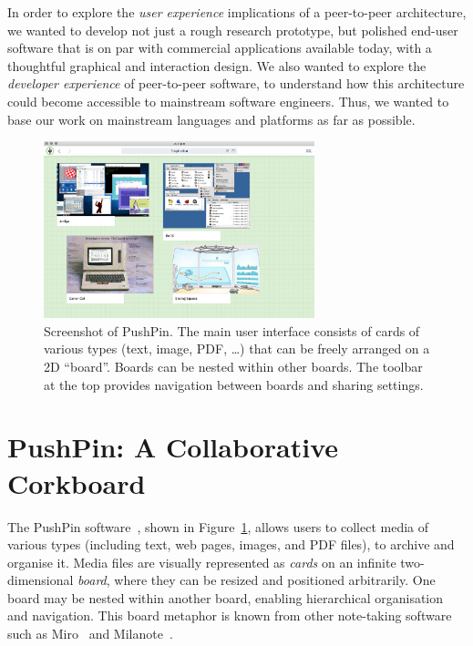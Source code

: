 \documentclass[sigplan,10pt]{acmart}
\begin{document}
In order to explore the \emph{user experience} implications of a peer-to-peer architecture, we wanted to develop not just a rough research prototype, but polished end-user software that is on par with commercial applications available today, with a thoughtful graphical and interaction design.
We also wanted to explore the \emph{developer experience} of peer-to-peer software, to understand how this architecture could become accessible to mainstream software engineers.
Thus, we wanted to base our work on mainstream languages and platforms as far as possible.

\begin{figure}
    \centering
    \includegraphics[width=0.7\textwidth]{pushpin.jpg}
    \caption{Screenshot of PushPin. The main user interface consists of cards of various types (text, image, PDF, \dots) that can be freely arranged on a 2D ``board''. Boards can be nested within other boards. The toolbar at the top provides navigation between boards and sharing settings.}
    \label{fig:pushpin}
\end{figure}

\section{PushPin: A Collaborative Corkboard}\label{sec:pushpin}

The PushPin software~\cite{PushPinSource}, shown in Figure~\ref{fig:pushpin}, allows users to collect media of various types (including text, web pages, images, and PDF files), to archive and organise it.
Media files are visually represented as \emph{cards} on an infinite two-dimensional \emph{board}, where they can be resized and positioned arbitrarily.
One board may be nested within another board, enabling hierarchical organisation and navigation.
This board metaphor is known from other note-taking software such as Miro~\cite{Miro} and Milanote~\cite{Milanote}.
\end{document}
